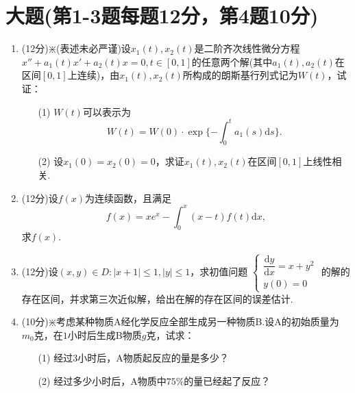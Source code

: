 \documentclass{ctexart}
\begin{document}
	\section{大题(第1-3题每题12分，第4题10分)}
	\begin{enumerate}
		\item (12分)$\divideontimes$(表述未必严谨)设$x_1(t),x_2(t)$是二阶齐次线性微分方程$x''+a_1(t)x'+a_2(t)x=0,t\in [0,1]$的任意两个解(其中$a_1(t),a_2(t)$在区间$[0,1]$上连续)，由$x_1(t),x_2(t)$所构成的朗斯基行列式记为$W(t)$，试证：
		\begin{enumerate}
			\item[(1)] $W(t)$可以表示为\[W(t)=W(0)\cdot\exp\{-\int_{0}^{t} a_1(s)\mathrm{d}s\}.\]
			\item[(2)] 设$x_1(0)=x_2(0)=0$，求证$x_1(t),x_2(t)$在区间$[0,1]$上线性相关.
		\end{enumerate}
		\vspace{5cm}
		
		\item (12分)设$f(x)$为连续函数，且满足\[f(x)=xe^x-\int_{0}^{x} (x-t)f(t)\mathrm{d}x ,\]求$f(x)$.
		\vspace{5cm}
		
		\item (12分)设$(x,y)\in D:\left|x+1\right|\leqslant 1,\left|y\right|\leqslant 1$，求初值问题
		$\begin{cases}
			\dfrac{\mathrm{d}y}{\mathrm{d}x}=x+y^2\\
			y(0)=0
		\end{cases}$
		的解的存在区间，并求第三次近似解，给出在解的存在区间的误差估计.
		\vspace{5cm}
		
		\item (10分)$\divideontimes$考虑某种物质A经化学反应全部生成另一种物质B.设A的初始质量为$m_0$克，在$1$小时后生成B物质$g$克，试求：
		\begin{enumerate}
			\item[(1)] 经过3小时后，A物质起反应的量是多少？
			\item[(2)] 经过多少小时后，A物质中$75\%$的量已经起了反应？
		\end{enumerate}
		\vspace{5cm}
		
	\end{enumerate}
\end{document}

